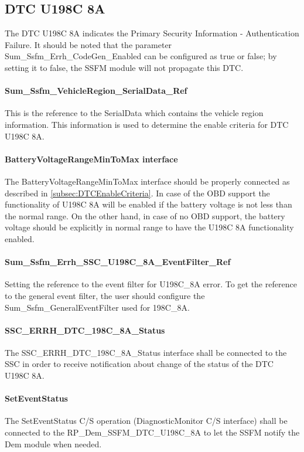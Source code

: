 \subsection{DTC U198C 8A}
\label{subsec:SSFMERRHDTCU198C8AHandler}

The DTC U198C 8A indicates the Primary Security Information - Authentication Failure.
It should be noted that the parameter Sum\_Ssfm\_Errh\_CodeGen\_Enabled can be configured as true or false; by setting it to false, the SSFM module will not propagate this DTC.

\paragraph{Sum\_Ssfm\_VehicleRegion\_SerialData\_Ref}
This is the reference to the SerialData which contains the vehicle region information. This information is used to determine the enable criteria for DTC U198C 8A.

\paragraph{BatteryVoltageRangeMinToMax interface}
The BatteryVoltageRangeMinToMax interface should be properly connected as described in \ref{subsec:DTCEnableCriteria}. In case of the OBD support the
functionality of U198C 8A will be enabled if the battery voltage is not less than the normal range. On the other hand, in case of no OBD support, the
battery voltage should be explicitly in normal range to have the U198C 8A functionality enabled.

\paragraph{Sum\_Ssfm\_Errh\_SSC\_U198C\_8A\_EventFilter\_Ref}
Setting the reference to the event filter for U198C\_8A error.
To get the reference to the general event filter, the user should configure the \\Sum\_Ssfm\_GeneralEventFilter used for 198C\_8A.

\paragraph{SSC\_ERRH\_DTC\_198C\_8A\_Status}
The SSC\_ERRH\_DTC\_198C\_8A\_Status interface shall be connected to the SSC in order to receive notification about change of the status of the DTC U198C 8A.

\paragraph{SetEventStatus}
The SetEventStatus C/S operation (DiagnosticMonitor C/S interface) shall be connected to the RP\_Dem\_SSFM\_DTC\_U198C\_8A to let the SSFM notify the Dem module when needed.

